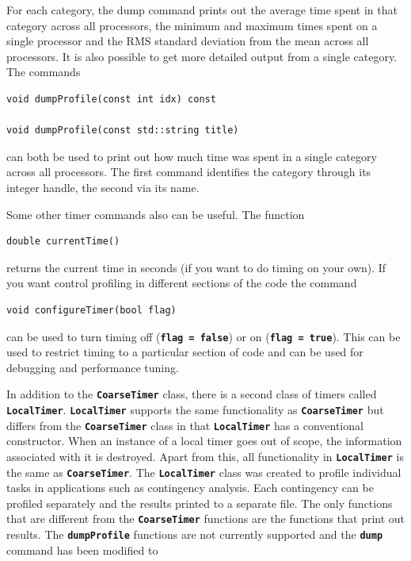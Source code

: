 \documentclass[12pt]{report} %
\begin{document}
For each category, the dump command prints out the average time spent in that category across all processors, the minimum and maximum times spent on a single processor and the RMS standard deviation from the mean across all processors. It is also possible to get more detailed output from a single category. The commands

{
\color{red}
\begin{Verbatim}[fontseries=b]
void dumpProfile(const int idx) const

void dumpProfile(const std::string title)
\end{Verbatim}
}

can both be used to print out how much time was spent in a single category across all processors. The first command identifies the category through its integer handle, the second via its name.

Some other timer commands also can be useful. The function

{
\color{red}
\begin{Verbatim}[fontseries=b]
double currentTime()
\end{Verbatim}
}

returns the current time in seconds (if you want to do timing on your own). If you want control profiling in different sections of the code the command

{
\color{red}
\begin{Verbatim}[fontseries=b]
void configureTimer(bool flag)
\end{Verbatim}
}

can be used to turn timing off (\texttt{\textbf{flag = false}}) or on (\texttt{\textbf{flag = true}}). This can be used to restrict timing to a particular section of code and can be used for debugging and performance tuning.

In addition to the \texttt{\textbf{CoarseTimer}} class, there is a second class of timers called \texttt{\textbf{LocalTimer}}. \texttt{\textbf{LocalTimer}} supports the same functionality as \texttt{\textbf{CoarseTimer}} but differs from the \texttt{\textbf{CoarseTimer}} class in that \texttt{\textbf{LocalTimer}} has a conventional constructor. When an instance of a local timer goes out of scope, the information associated with it is destroyed. Apart from this, all functionality in \texttt{\textbf{LocalTimer}} is the same as \texttt{\textbf{CoarseTimer}}. The \texttt{\textbf{LocalTimer}} class was created to profile individual tasks in applications such as contingency analysis. Each contingency can be profiled separately and the results printed to a separate file. The only functions that are different from the \texttt{\textbf{CoarseTimer}} functions are the functions that print out results. The \texttt{\textbf{dumpProfile}} functions are not currently supported and the \texttt{\textbf{dump}} command has been modified to
\end{document}
